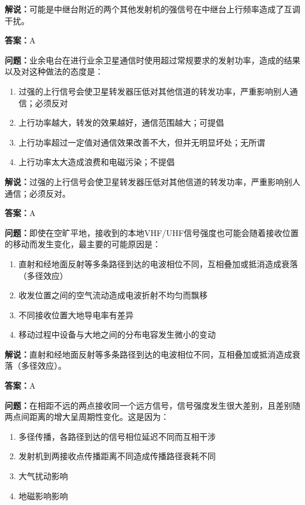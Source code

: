 \documentclass[UTF8]{ctexbook}
\begin{document}
\textbf{解说：}可能是中继台附近的两个其他发射机的强信号在中继台上行频率造成了互调干扰。%

\textbf{答案：}A

\textbf{问题：}业余电台在进行业余卫星通信时使用超过常规要求的发射功率，造成的结果以及对这种做法的态度是：

\begin{enumerate}[label=\Alph*), leftmargin=3em]
  \item 过强的上行信号会使卫星转发器压低对其他信道的转发功率，严重影响别人通信；必须反对
  \item 上行功率越大，转发的效果越好，通信范围越大；可提倡
  \item 上行功率超过一定值对通信效果改善不大，但并无明显坏处；无所谓
  \item 上行功率太大造成浪费和电磁污染；不提倡
\end{enumerate}

\textbf{解说：}过强的上行信号会使卫星转发器压低对其他信道的转发功率，严重影响别人通信；必须反对。%

\textbf{答案：}A

\textbf{问题：}即使在空旷平地，接收到的本地VHF/UHF信号强度也可能会随着接收位置的移动而发生变化，最主要的可能原因是：

\begin{enumerate}[label=\Alph*), leftmargin=3em]
  \item 直射和经地面反射等多条路径到达的电波相位不同，互相叠加或抵消造成衰落（多径效应）
  \item 收发位置之间的空气流动造成电波折射不均匀而飘移
  \item 不同接收位置大地导电率有差异
  \item 移动过程中设备与大地之间的分布电容发生微小的变动
\end{enumerate}

\textbf{解说：}直射和经地面反射等多条路径到达的电波相位不同，互相叠加或抵消造成衰落（多径效应）。%

\textbf{答案：}A

\textbf{问题：}在相距不远的两点接收同一个远方信号，信号强度发生很大差别，且差别随两点间距离的增大呈周期性变化。这是因为：

\begin{enumerate}[label=\Alph*), leftmargin=3em]
  \item 多径传播，各路径到达的信号相位延迟不同而互相干涉
  \item 发射机到两接收点传播距离不同造成传播路径衰耗不同
  \item 大气扰动影响
  \item 地磁影响影响
\end{enumerate}
\end{document}
